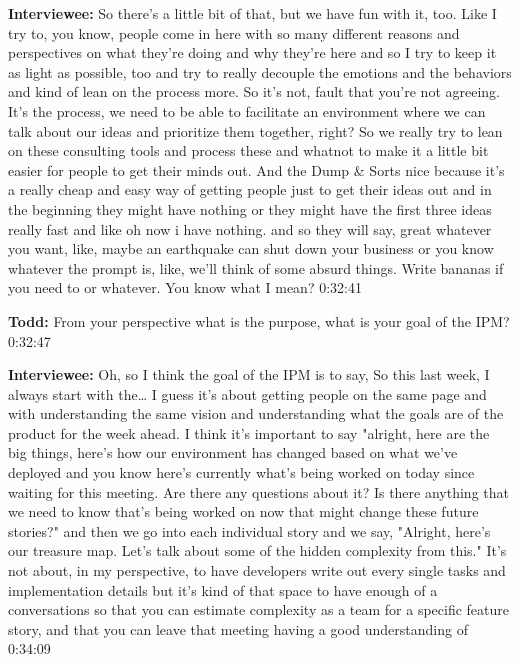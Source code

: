 \textbf{Interviewee:} So there's a little bit of that, but we have fun with it, too.  Like I try to, you know, people come in here with so many different reasons and perspectives on what they're doing and why they're here and so I try to keep it as light as possible, too and try to really decouple the emotions and the behaviors and kind of lean on the process more.  So it's not,   fault that you're not agreeing.  It's the process, we need to be able to facilitate an environment where we can talk about our ideas and prioritize them together, right?  So we really try to lean on these consulting tools and process these and whatnot to make it a little bit easier for people to get their minds out.  And the Dump \& Sorts nice because it's a really cheap and easy way of getting people just to get their ideas out and in the beginning they might have nothing or they might have the first three ideas really fast and like oh now i have nothing. and so they will say, great whatever you want, like, maybe an earthquake can shut down your business or you know whatever the prompt is, like, we'll think of some absurd things.  Write bananas if you need to or whatever.  You know what I mean?   0:32:41

\textbf{Todd:} From your perspective what is the purpose, what is your goal of the IPM?   0:32:47

\textbf{Interviewee:} Oh, so I think the goal of the IPM is to say,  So this last week, I always start with the… I guess it's about getting people on the same page and with understanding the same vision and understanding what the goals are of the product for the week ahead.  I think it's important to say "alright, here are the big things, here's how our environment has changed based on what we've deployed and you know here's currently what's being worked on today since waiting for this meeting.  Are there any questions about it?  Is there anything that we need to know that's being worked on now that might change these future stories?" and then we go into each individual story and we say, "Alright, here's our treasure map. Let's talk about some of the hidden complexity from this."  It's not about, in my perspective, to have developers write out every single tasks and implementation details but it's kind of that space to have enough of a conversations so that you can estimate complexity as a team for a specific feature story, and that you can leave that meeting having a good understanding of    0:34:09


